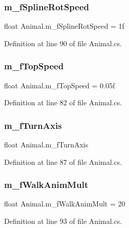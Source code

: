 \subsubsection{\texorpdfstring{m\+\_\+f\+Spline\+Rot\+Speed}{m\_fSplineRotSpeed}}
{\footnotesize\ttfamily float Animal.\+m\+\_\+f\+Spline\+Rot\+Speed = 1f}



Definition at line 90 of file Animal.\+cs.

\mbox{\label{class_animal_a66e141cf619fde63384c1759988c95ca}} 
\subsubsection{\texorpdfstring{m\+\_\+f\+Top\+Speed}{m\_fTopSpeed}}
{\footnotesize\ttfamily float Animal.\+m\+\_\+f\+Top\+Speed = 0.\+05f}



Definition at line 82 of file Animal.\+cs.

\mbox{\label{class_animal_a526af3f4cd5e19f8449ce4a01a4cb65e}} 
\subsubsection{\texorpdfstring{m\+\_\+f\+Turn\+Axis}{m\_fTurnAxis}}
{\footnotesize\ttfamily float Animal.\+m\+\_\+f\+Turn\+Axis}



Definition at line 87 of file Animal.\+cs.

\mbox{\label{class_animal_ae003f54a88ce9c5790651eb2e2b739eb}} 
\subsubsection{\texorpdfstring{m\+\_\+f\+Walk\+Anim\+Mult}{m\_fWalkAnimMult}}
{\footnotesize\ttfamily float Animal.\+m\+\_\+f\+Walk\+Anim\+Mult = 20}



Definition at line 93 of file Animal.\+cs.

